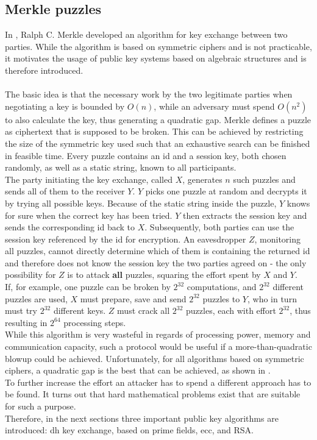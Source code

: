 \subsection{Merkle puzzles}
In \cite{Merkle}, Ralph C. Merkle developed an algorithm for key exchange between two parties. While the algorithm is based on symmetric ciphers and is
not practicable, it motivates the usage of public key systems based on algebraic structures and is therefore introduced.
\\
\\
The basic idea is that the necessary work by the two legitimate parties when negotiating a key is bounded by $O(n)$, while an adversary must spend $O(n^2)$ to 
also calculate the key, thus generating a quadratic gap. 
Merkle defines a puzzle as ciphertext that is supposed to be broken. This can be achieved by restricting the size of the symmetric key used such that an
exhaustive search can be finished in feasible time. Every puzzle contains an id and a session key, both chosen randomly, as well as a static string,
known to all participants.
\\
The party initiating the key exchange, called $X$, generates $n$ such puzzles and sends all of them to the receiver $Y$. $Y$ picks one puzzle at random and
decrypts it by trying all possible keys. Because of the static string inside the puzzle, $Y$ knows for sure when the correct key has been tried.
$Y$ then extracts the session key and sends the corresponding id back to $X$. Subsequently, both parties can use the session key referenced by the id for encryption.
An eavesdropper $Z$, monitoring all puzzles, cannot directly determine which of them is containing the returned id and therefore does not know the session key the 
two parties agreed on - the only possibility for $Z$ is to attack \textbf{all} puzzles, squaring the effort spent by $X$ and $Y$.
\\
If, for example, one puzzle can be broken by $2^{32}$ computations, and $2^{32}$ different puzzles are used, $X$ must prepare, save and send $2^{32}$ puzzles
to $Y$, who in turn must try $2^{32}$ different keys. $Z$ must crack all $2^{32}$ puzzles, each with effort $2^{32}$, thus resulting in $2^{64}$ processing steps.
\\
While this algorithm is very wasteful in regards of processing power, memory and communication capacity, such a protocol would be useful if a more-than-quadratic
blowup could be achieved. Unfortunately, for all algorithms based on symmetric ciphers, a quadratic gap is the best that can be achieved,
as shown in \cite{Barak09merklepuzzles}.   
\\ 
To further increase the effort an attacker has to spend a different approach has to be found. It turns out that hard mathematical problems exist that are 
suitable for such a purpose. 
\\
Therefore, in the next sections three important public key algorithms are introduced: \gls{dh} key exchange, based on prime fields, \gls{ecc}, and RSA.
